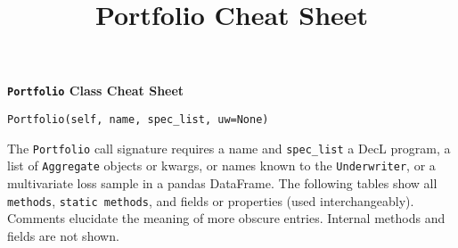 %
%
%


\title{Portfolio Cheat Sheet}




{\huge{\textbf{\texttt{Portfolio} Class Cheat Sheet}}}

\raggedright
\texttt{\m Portfolio(self, name, spec\_list, uw=None)}

The \texttt{Portfolio} call signature requires a name and \texttt{spec\_list} a DecL program, a list of \texttt{Aggregate} objects or kwargs, or names known to the \texttt{Underwriter}, or a multivariate loss sample in a pandas DataFrame.
The following tables show all \texttt{\m methods}, \texttt{\s static methods}, and fields or properties (used interchangeably). Comments elucidate the meaning of more obscure entries. Internal methods and fields are not shown.


